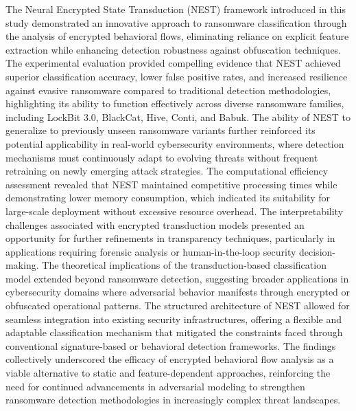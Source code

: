 \documentclass[lettersize,journal]{IEEEtran}
\begin{document}
The Neural Encrypted State Transduction (NEST) framework introduced in this study demonstrated an innovative approach to ransomware classification through the analysis of encrypted behavioral flows, eliminating reliance on explicit feature extraction while enhancing detection robustness against obfuscation techniques. The experimental evaluation provided compelling evidence that NEST achieved superior classification accuracy, lower false positive rates, and increased resilience against evasive ransomware compared to traditional detection methodologies, highlighting its ability to function effectively across diverse ransomware families, including LockBit 3.0, BlackCat, Hive, Conti, and Babuk. The ability of NEST to generalize to previously unseen ransomware variants further reinforced its potential applicability in real-world cybersecurity environments, where detection mechanisms must continuously adapt to evolving threats without frequent retraining on newly emerging attack strategies. The computational efficiency assessment revealed that NEST maintained competitive processing times while demonstrating lower memory consumption, which indicated its suitability for large-scale deployment without excessive resource overhead. The interpretability challenges associated with encrypted transduction models presented an opportunity for further refinements in transparency techniques, particularly in applications requiring forensic analysis or human-in-the-loop security decision-making. The theoretical implications of the transduction-based classification model extended beyond ransomware detection, suggesting broader applications in cybersecurity domains where adversarial behavior manifests through encrypted or obfuscated operational patterns. The structured architecture of NEST allowed for seamless integration into existing security infrastructures, offering a flexible and adaptable classification mechanism that mitigated the constraints faced through conventional signature-based or behavioral detection frameworks. The findings collectively underscored the efficacy of encrypted behavioral flow analysis as a viable alternative to static and feature-dependent approaches, reinforcing the need for continued advancements in adversarial modeling to strengthen ransomware detection methodologies in increasingly complex threat landscapes.





\end{document}
